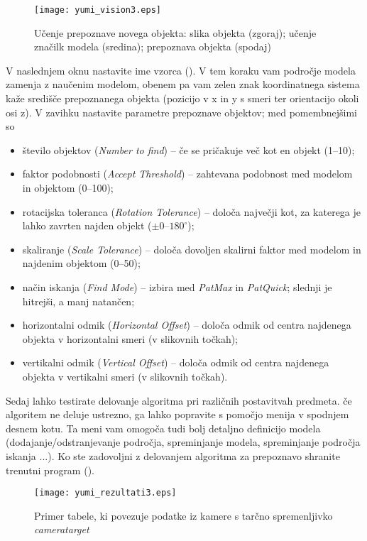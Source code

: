 \begin{figure}[!hbt]
\centering
\texttt{[image: yumi\_vision3.eps]}
\caption{Učenje prepoznave novega objekta: slika objekta (zgoraj); učenje značilk modela (sredina); prepoznava objekta (spodaj)}
\label{fig:yumi_vision}
\end{figure}

V naslednjem oknu nastavite ime vzorca (). V tem koraku vam področje modela zamenja z naučenim modelom, obenem pa vam zelen znak koordinatnega sistema kaže središče prepoznanega objekta (pozicijo v x in y s smeri ter orientacijo okoli osi z). V zavihku  nastavite parametre prepoznave objektov; med pomembnejšimi so
\begin{itemize}
  \item število objektov (\emph{Number to find}) -- če se pričakuje več kot en objekt (1--10);
  \item faktor podobnosti (\emph{Accept Threshold}) -- zahtevana podobnost med modelom in objektom (0--100);
  \item rotacijska toleranca (\emph{Rotation Tolerance}) -- določa največji kot, za katerega je lahko zavrten najden objekt ($\pm 0$--$180^\circ$);
  \item skaliranje (\emph{Scale Tolerance}) -- določa dovoljen skalirni faktor med modelom in najdenim objektom (0--50);
  \item način iskanja (\emph{Find Mode}) -- izbira med \emph{PatMax} in \emph{PatQuick}; slednji je hitrejši, a manj natančen;
  \item horizontalni odmik (\emph{Horizontal Offset}) -- določa odmik od centra najdenega objekta v horizontalni smeri (v slikovnih točkah);
  \item vertikalni odmik (\emph{Vertical Offset}) -- določa odmik od centra najdenega objekta v vertikalni smeri (v slikovnih točkah).
\end{itemize}


Sedaj lahko testirate delovanje algoritma pri različnih postavitvah predmeta. če algoritem ne deluje ustrezno, ga lahko popravite s pomočjo menija v spodnjem desnem kotu. Ta meni vam omogoča tudi bolj detaljno definicijo modela (dodajanje/odstranjevanje področja, spreminjanje modela, spreminjanje področja iskanja ...). Ko ste zadovoljni z delovanjem algoritma za prepoznavo shranite trenutni program ().

\begin{figure}[!hbt]
\centering
\texttt{[image: yumi\_rezultati3.eps]}
\caption{Primer tabele, ki povezuje podatke iz kamere s tarčno spremenljivko \emph{cameratarget}}
\label{fig:yumi_tabela}
\end{figure}

